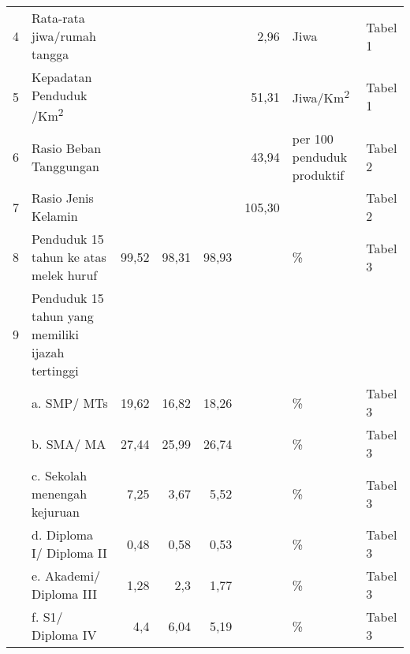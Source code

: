 \begin{small}
\begin{longtable}{rY{12em}rrrrY{5em}Y{5em}}
	  4 & Rata-rata jiwa/rumah tangga                                                 &        &        &                    &     2,96 & Jiwa                           & Tabel 1  \\
	  5 & Kepadatan Penduduk /Km\textsuperscript{2}                                   &        &        &                    &    51,31 & Jiwa/Km\textsuperscript{2}     & Tabel 1  \\
	  6 & Rasio Beban Tanggungan                                                      &        &        &                    &    43,94 & per 100 penduduk produktif     & Tabel 2  \\
	  7 & Rasio Jenis Kelamin                                                         &        &        &                    &   105,30 &                                & Tabel 2  \\
	  8 & Penduduk 15 tahun ke atas melek huruf                                       &  99,52 &  98,31 &              98,93 &          & \%                             & Tabel 3  \\
	  9 & Penduduk 15 tahun yang memiliki ijazah tertinggi                            &        &        &                    &          &                                &          \\
		& a. SMP/ MTs                                                                 &  19,62 &  16,82 &              18,26 &          & \%                             & Tabel 3  \\
		& b. SMA/ MA                                                                  &  27,44 &  25,99 &              26,74 &          & \%                             & Tabel 3  \\
		& c. Sekolah menengah kejuruan                                                &   7,25 &   3,67 &               5,52 &          & \%                             & Tabel 3  \\
		& d. Diploma I/ Diploma II                                                    &   0,48 &   0,58 &               0,53 &          & \%                             & Tabel 3  \\
		& e. Akademi/ Diploma III                                                     &   1,28 &    2,3 &               1,77 &          & \%                             & Tabel 3  \\
		& f. S1/ Diploma IV                                                           &    4,4 &   6,04 &               5,19 &          & \%                             & Tabel 3  \\

\end{longtable}
\end{small}
